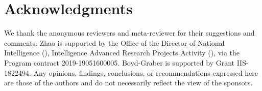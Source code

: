 
\section*{Acknowledgments}

We thank the anonymous reviewers
and meta-reviewer
for their suggestions and comments.
Zhao is supported by the Office of the Director of National Intelligence (), 
Intelligence Advanced Research Projects Activity (), via the  Program contract 2019-19051600005. 
Boyd-Graber is supported by  Grant IIS-1822494.
Any opinions, findings, conclusions, or recommendations
expressed here are those of the authors and do not
necessarily reflect the view of the sponsors.

